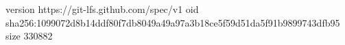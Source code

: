 version https://git-lfs.github.com/spec/v1
oid sha256:1099072d8b14ddf80f7db8049a49a97a3b18ce5f59d51da5f91b9899743dfb95
size 330882
